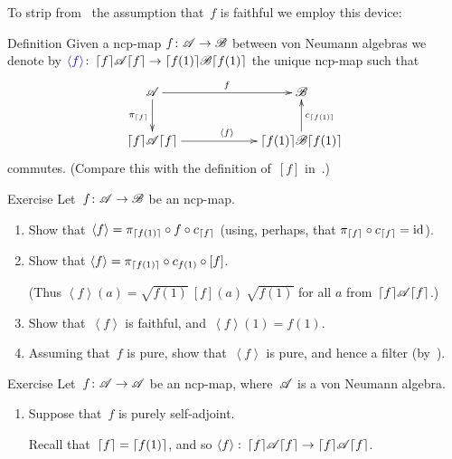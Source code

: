 \documentclass[a]{subfiles}
\begin{document}
\begin{parsec}%
\begin{point}%
To strip 
from~
the assumption 
that~$f$
is faithful 
we employ this device:
\end{point}
\begin{point}[chevron-f]{Definition}%
Given a ncp-map $f\colon \mathscr{A}\to\mathscr{B}$
between von Neumann algebras
we denote by
$\Define{\left<f\right>}\colon \ceil{f}\!\scrA\!\ceil{f}
\to \ceil{f(1)}\!\scrB\!\ceil{f(1)}$
the unique ncp-map
such that 
\begin{equation*}
\xymatrix@C=6em{
\scrA
\ar[r]^f
\ar[d]_{\pi_{\ceil{f}}}
&
\scrB
\\
\ceil{f}\!\scrA\!\ceil{f}
\ar[r]^{\left<f\right>}
&
\ceil{f(1)}\!\scrB\!\ceil{f(1)}
\ar[u]_{c_{\ceil{f(1)}}}
}
\end{equation*}
commutes.
(Compare this with the definition of~$[f]$ in~.)
\end{point}
\begin{point}{Exercise}%
Let~$f\colon \mathscr{A}\to\mathscr{B}$ be an ncp-map.
\begin{enumerate}
\item
Show that~$\left<f\right>
= \pi_{\left\lceil f(1)\right\rceil}\circ f \circ c_{\left\lceil f\right\rceil}$
(using, perhaps, that $\pi_{\left\lceil f\right\rceil}\circ c_{\left\lceil f\right\rceil}=\operatorname{id}$).
\item
Show that
$\left<f\right> = \pi_{\left\lceil f(1)\right\rceil} \circ c_{f(1)}\circ [f]$.

(Thus $\left<f\right>\!(a) = 
\sqrt{f(1)}\ [f]\!(a)\ \sqrt{f(1)}$
for all $a$ from~$\left\lceil f\right\rceil\!\mathscr{A}\!\left\lceil f\right\rceil$.)
\item
Show that~$\left<f\right>$
is faithful,
and~$\left<f\right>\!(1)=f(1)$.
\item
Assuming that~$f$ is pure,
show that~$\left<f\right>$ is pure,
and hence a filter (by~).
\end{enumerate}
\end{point}
\begin{point}{Exercise}%
Let~$f\colon \mathscr{A}\to\mathscr{A}$
be an ncp-map, where~$\mathscr{A}$ is a von Neumann algebra.
\begin{enumerate}
\item
Suppose that~$f$ is purely self-adjoint.

Recall that~$\left\lceil f\right\rceil=\left\lceil f(1)\right\rceil$,
and so $\left<f\right>\colon \left\lceil f\right\rceil\!\mathscr{A}\!\left\lceil f\right\rceil
\to \left\lceil f\right\rceil\!\mathscr{A}\!\left\lceil f\right\rceil$.


\end{enumerate}
\end{point}
\end{parsec}
\end{document}
